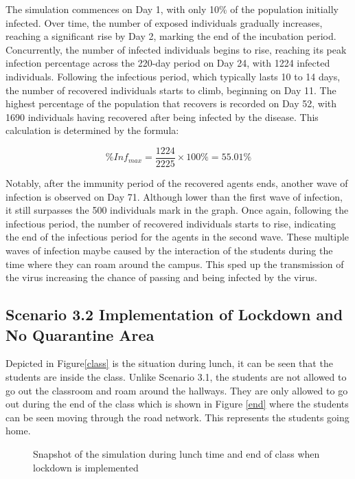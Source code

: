The simulation commences on Day 1, with only 10\% of the population initially infected. Over time, the number of exposed individuals gradually increases, reaching a significant rise by Day 2, marking the end of the incubation period. Concurrently, the number of infected individuals begins to rise, reaching its peak infection percentage across the 220-day period on Day 24, with 1224 infected individuals. Following the infectious period, which typically lasts 10 to 14 days, the number of recovered individuals starts to climb, beginning on Day 11. The highest percentage of the population that recovers is recorded on Day 52, with 1690 individuals having recovered after being infected by the disease. This calculation is determined by the formula:

\[ \%Inf_{max} = \frac{1224}{2225} \times 100\% = 55.01\%\]

Notably, after the immunity period of the recovered agents ends, another wave of infection is observed on Day 71. Although lower than the first wave of infection, it still surpasses the 500 individuals mark in the graph. Once again, following the infectious period, the number of recovered individuals starts to rise, indicating the end of the infectious period for the agents in the second wave. These multiple waves of infection maybe caused by the interaction of the students during the time where they can roam around the campus. This sped up the transmission of the virus increasing the chance of passing and being infected by the virus. 

\subsection{ Scenario 3.2 Implementation of Lockdown and No Quarantine Area}
\label{3.2}
Depicted in  Figure\ref{class} is the situation during lunch, it can be seen that the students are inside the class. Unlike Scenario 3.1, the students are not allowed to go out the classroom and roam around the hallways. They are only allowed to go out during the end of the class which is shown in Figure \ref{end} where the students can be seen moving through the road network. This represents the students going home. 

\begin{figure}[H]
\centering
{}
\quad
{}
	\caption{Snapshot of the simulation during lunch time and end of class when lockdown is implemented}
	\end{figure}
	
